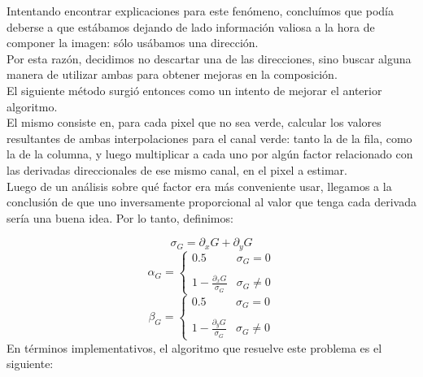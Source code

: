 \documentclass[a4paper]{article}
\begin{document}
\pagebreak
Intentando encontrar explicaciones para este fenómeno, concluímos que podía deberse a que estábamos dejando de lado información valiosa a la hora de componer la imagen: sólo usábamos una dirección.\\
\indent Por esta razón, decidimos no descartar una de las direcciones, sino buscar alguna manera de utilizar ambas para obtener mejoras en la composición.\\
El siguiente método surgió entonces como un intento de mejorar el anterior algoritmo.\\

El mismo consiste en, para cada pixel que no sea verde, calcular los valores resultantes de ambas interpolaciones para el canal verde: tanto la de la fila, como la de la columna, y luego multiplicar a cada uno por algún factor relacionado con las derivadas direccionales de ese mismo canal, en el pixel a estimar.\\

Luego de un análisis sobre qué factor era más conveniente usar, llegamos a la conclusión de que uno inversamente proporcional al valor que tenga cada derivada sería una buena idea. Por lo tanto, definimos:

\[\sigma_G = \partial_xG + \partial_yG \]
\smallskip
\[\alpha_G = 
\begin{cases}
0.5 & \sigma_G = 0 \\
  &  \\
1-\frac{\partial_xG}{\sigma_G} & \sigma_G \neq 0
\end{cases}
\]
\medskip
\[\beta_G = 
\begin{cases}
0.5 & \sigma_G = 0 \\
  &  \\
1-\frac{\partial_yG}{\sigma_G} & \sigma_G \neq 0
\end{cases}
\]
\bigskip
En términos implementativos, el algoritmo que resuelve este problema es el siguiente:
\pagebreak
\end{document}
